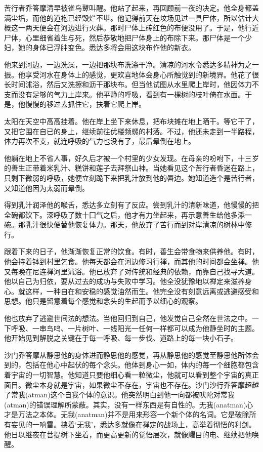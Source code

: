 \documentclass[12pt,twoside,openany]{book}
\begin{document}
苦行者乔答摩清早被雀鸟鼙叫醒。他站了起来，再回顾前一夜的决定。他全身都盖满尘垢，而他的道袍已经毁烂不堪。他记得前天在坟场见过一具尸体，所以估计大概这一两天便会在河边进行火葬。那时尸体上砖红色的布便没用了。于是，他行近尸体，心里细省着生与死，然后恭敬地把尸体身上的布除下来。那尸体是一个少妇，她的身体已浮肿变色。悉达多将会用这块布作他的新衣。

他来到河边，一边洗澡，一边把那块布洗涤干净。清凉的河水令悉达多精神为之一振。他享受河水在身体上的感觉，更欢喜地体会身心所触觉到的新境界。他花了很长时间沭浴，然后又洗擦和沥干那块布。但当他试图从水里爬上岸时，他因体力不支而没有足够的气力上岸来。他平静的呼吸，看到有一棵树的枝叶倚在水面。于是，他慢慢的移过去抓住它，扶着它爬上岸。

太阳在天空中高高挂着。他在岸上坐下来休息，把布块摊在地上晒干。等它干了，又把它围在自已的身上，继续前往优楼频螺的村落。不过，他还未走到一半路程，体力再次不支，就连呼吸的气力也没有了，最后晕倒在地上。

他躺在地上不省人事，好久后才被一个村里的少女发现。在母亲的吩咐下，十三岁的善生正带着米乳汁、糕饼和莲子去拜祭山神。当她看见这个苦行者昏迷在路上，只剩下微弱的呼吸，她便立刻跪下来把乳汁放到他的唇边。她知道造个是苦行者，又知道他因为太弱而晕倒。

得到乳汁润泽他的喉舌，悉达多立刻有了反应。尝到乳汁的清新味道，他慢慢的把全碗都饮下。深呼吸了数十囗气之后，他才有力坐起来，再示意善生给他多添一碗。那乳汁很快便替他恢复体力。那天，他放弃了苦行而到对岸清凉的树林中修行。

跟着下来的日子，他渐渐恢复正常的饮食。有时，善生会带食物来供养他。有时，他会持着钵到村里乞食。他每天都会在河边修习行禅，而其他的时间都会坐禅。他又每晚在尼连禅河里沭浴。他已放弃了对传统和经典的依赖，而靠自己找寻大道。他以自己为归依，要从过去的成功与失败中学习。他全没犹豫地以禅定来滋养身心。就这样，一种自在和安稳的感觉油然而生。他完全没有刻意远离或逃避感受和思想。他只是留意着每个感觉和念头的生起而予以细心的观察。

他也放弃了逃避世间法的想法。当他回归到自己，他发觉自己全然在世法之中。一下呼吸、一串鸟呜、一片树叶、一线阳光一任何一样都可以成为他静坐时的主题。他开始见到解脱之关键在于每一呼吸、每一步伐、道路上的每一块小石子。

沙门乔答摩从静思他的身体进而静思他的感觉，再从静思他的感觉至静思他所体会到的，包括在他心中起伏的每个念头。他体到身心一如，体内的每一个细胞都包含着宇宙的一切智慧。他知道只要他细心看一粒微尘，他就可以看到整个宇宙的真正面目。微尘本身就是宇宙，如果微尘不存在，宇宙也不存在。沙门沙行乔答摩超越了常我(atman)这个自我个体的意识。他突然明白到他一向都被吠陀对常我(atman)的错误理解所蒙蔽。其实，没有一样东西是有自性的。无我(anatman)心才是万法之本体。无我(anatman)并不是用来形容一个新个体的名词。它是破除所有妄见的一响雷。挟着‘无我’，悉达多就像在禅定的战场上，高举着彻悟的利剑。他日以继夜在菩提树下坐着，而更高更新的觉悟层次，就像耀目的电、继续把他唤醒。
\end{document}
